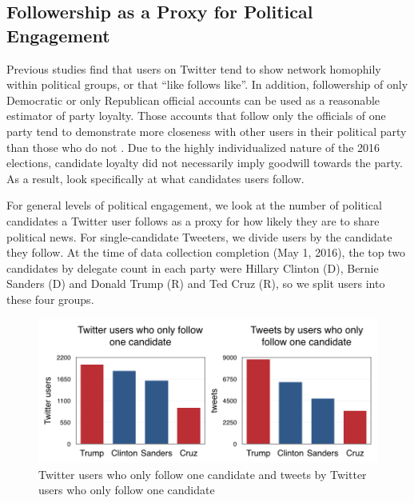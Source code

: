 \documentclass[letterpaper]{article}
\begin{document}
 \subsection{Followership as a Proxy for Political Engagement}
Previous studies find that users on Twitter tend to show network homophily within political groups, or that ``like follows like''. In addition, followership of only Democratic or only Republican official accounts can be used as a reasonable estimator of party loyalty. Those accounts that follow only the officials of one party tend to demonstrate more closeness with other users in their political party than those who do not \cite{colleoni2014echo}. Due to the highly individualized nature of the 2016 elections, candidate loyalty did not necessarily imply goodwill towards the party. As a result, look specifically at what candidates users follow. 

For general levels of political engagement, we look at the number of political candidates a Twitter user follows as a proxy for how likely they are to share political news. For single-candidate Tweeters, we divide users by the candidate they follow. At the time of data collection completion (May 1, 2016), the top two candidates by delegate count in each party were Hillary Clinton (D), Bernie Sanders (D) and Donald Trump (R) and Ted Cruz (R), so we split users into these four groups. 



\begin{figure}[t!]  
\centering 
  \includegraphics[width=\columnwidth]{single-candid-charts}  
   \caption{Twitter users who only follow one candidate and tweets by Twitter users who only follow one candidate
     \label{fig:single-candid-stats}}
\end{figure} 
\end{document}
